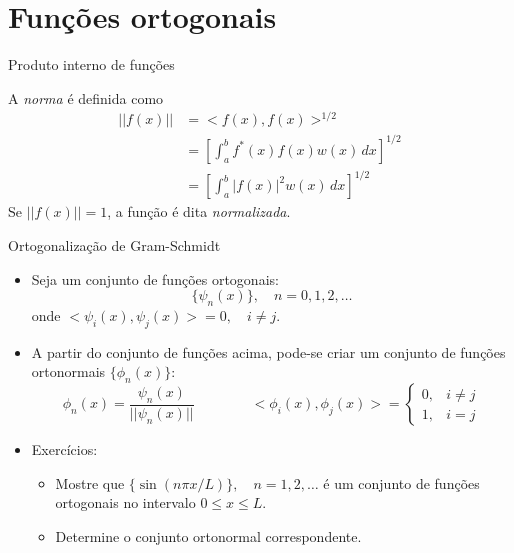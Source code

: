      \section[slide=True]{Funções ortogonais}

     \begin{slide}[toc=]{Produto interno de funções}
	     \begin{itemize}
			     {
		     \item A \emph{norma} é definida como 
			     \begin{align*}
				     ||f(x)|| &= <f(x),f(x)>^{1/2}\\
					      &= \left [\int_a^bf^\ast(x)f(x)w(x)\,dx \right ]^{1/2}\\
					      &= \left [\int_a^b|f(x)|^2w(x)\,dx \right ]^{1/2}
			     \end{align*}
			     Se $||f(x)||=1$, a função é dita \emph{normalizada}.}
	     \end{itemize}
     \end{slide}

     \begin{slide}[toc=]{Ortogonalização de Gram-Schmidt}
	     \begin{itemize}
		     \item Seja um conjunto de funções ortogonais:
			     \begin{equation*}
				     \{ \psi_n(x) \},\quad n=0,1,2, \dots
			     \end{equation*}
			     onde $<\psi_i(x), \psi_j(x)> = 0,\quad i\neq j$.
		     \item A partir do conjunto de funções acima, pode-se criar um conjunto de funções ortonormais $\{\phi_n(x)\}$:
			     \begin{equation*}
				     \phi_n(x)=\frac{\psi_n(x)}{||\psi_n(x)||}\qquad\qquad 
				     <\phi_i(x),\phi_j(x)>=\begin{cases} 0, & i\neq j\\1, & i=j\end{cases}
			     \end{equation*}
		     \item Exercícios:
			     \begin{itemize}
				     \item Mostre que $\{ \sin (n\pi x/L)\}, \quad n = 1, 2, \dots$ é um conjunto de funções  ortogonais no intervalo $0\leq x \leq L$.
				     \item Determine o conjunto ortonormal correspondente.
			     \end{itemize}
	     \end{itemize}
     \end{slide}

